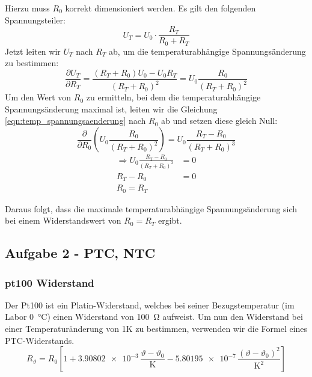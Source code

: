 Hierzu muss $R_0$ korrekt dimensioniert werden.
Es gilt den folgenden Spannungsteiler:
\begin{equation}
    U_T = U_0 \cdot \frac{R_T}{R_0 + R_T}
\end{equation}
Jetzt leiten wir $U_T$ nach $R_T$ ab, um die temperaturabhängige Spannungsänderung zu bestimmen:
\begin{equation}
    \label{eqn:temp_spannungsaenderung}
    \frac{\partial U_T}{\partial R_T} = \frac{(R_T+R_0)U_0-U_0R_T}{(R_T+R_0)^2} = U_0 \frac{R_0}{(R_T+R_0)^2}
\end{equation}
Um den Wert von $R_0$ zu ermitteln, bei dem die temperaturabhängige Spannungsänderung maximal ist, leiten wir die Gleichung \ref{eqn:temp_spannungsaenderung} nach $R_0$ ab und setzen diese gleich Null:
\begin{equation}
    \frac{\partial}{\partial R_0}\left( U_0 \frac{R_0}{(R_T+R_0)^2} \right) = U_0 \frac{R_T-R_0}{(R_T+R_0)^3}
\end{equation}
\begin{align}
    \Rightarrow U_0 \frac{R_T-R_0}{(R_T+R_0)^3} & = 0           \\
    R_T - R_0                                   & = 0 \nonumber \\
    \boxed{R_0 = R_T} \nonumber
\end{align}

Daraus folgt, dass die maximale temperaturabhängige Spannungsänderung sich bei einem Widerstandswert von $R_0 = R_T$ ergibt.

\subsection{Aufgabe 2 - PTC, NTC}
\subsubsection{pt100 Widerstand}
Der Pt100 ist ein Platin-Widerstand, welches bei seiner Bezugstemperatur (im Labor \SI{0}{\degreeCelsius}) einen Widerstand von \SI{100}{\ohm} aufweist.
Um nun den Widerstand bei einer Temperaturänderung von 1K zu bestimmen, verwenden wir die Formel eines PTC-Widerstands.
\begin{equation}
    R_{\vartheta} = R_0 \left[
        1
        + \num{3.90802e-3} \, \frac{\vartheta - \vartheta_0}{\mathrm{K}}
        - \num{5.80195e-7} \, \frac{(\vartheta - \vartheta_0)^2}{\mathrm{K^2}}
        \right]
\end{equation}

